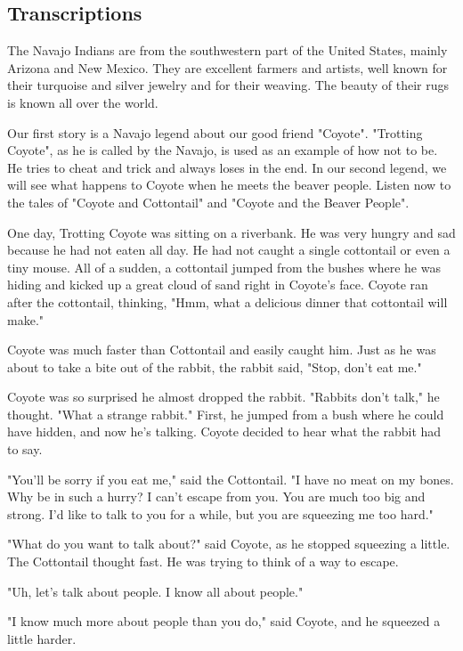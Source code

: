 \subsection{Transcriptions}

The Navajo Indians are from the southwestern part of the United States, mainly Arizona and New Mexico. They are excellent farmers and artists, well known for their turquoise and silver jewelry and for their weaving. The beauty of their rugs is known all over the world.

Our first story is a Navajo legend about our good friend "Coyote". "Trotting Coyote", as he is called by the Navajo, is used as an example of how not to be. He tries to cheat and trick and always loses in the end. In our second legend, we will see what happens to Coyote when he meets the beaver people. Listen now to the tales of "Coyote and Cottontail" and "Coyote and the Beaver People".

One day, Trotting Coyote was sitting on a riverbank. He was very hungry and sad because he had not eaten all day. He had not caught a single cottontail or even a tiny mouse. All of a sudden, a cottontail jumped from the bushes where he was hiding and kicked up a great cloud of sand right in Coyote's face. Coyote ran after the cottontail, thinking, "Hmm, what a delicious dinner that cottontail will make."

Coyote was much faster than Cottontail and easily caught him. Just as he was about to take a bite out of the rabbit, the rabbit said, "Stop, don't eat me."

Coyote was so surprised he almost dropped the rabbit. "Rabbits don't talk," he thought. "What a strange rabbit." First, he jumped from a bush where he could have hidden, and now he's talking. Coyote decided to hear what the rabbit had to say.

"You'll be sorry if you eat me," said the Cottontail. "I have no meat on my bones. Why be in such a hurry? I can't escape from you. You are much too big and strong. I'd like to talk to you for a while, but you are squeezing me too hard."

"What do you want to talk about?" said Coyote, as he stopped squeezing a little. The Cottontail thought fast. He was trying to think of a way to escape.

"Uh, let's talk about people. I know all about people."

"I know much more about people than you do," said Coyote, and he squeezed a little harder.

